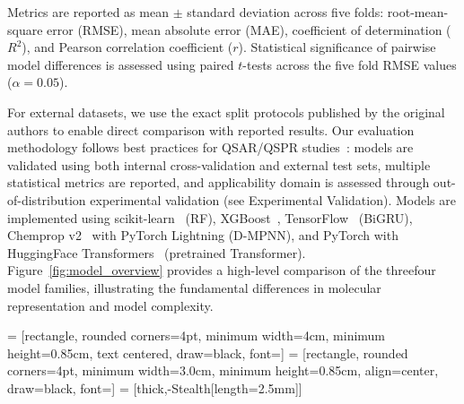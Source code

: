 \documentclass[journal=jcisd8,manuscript=article]{achemso}
\newcommand{\added}[1]{{\color{addedblue}#1}}
\newcommand{\removed}[1]{{\color{removedred}#1}}
\begin{document}
Metrics are reported as mean $\pm$ standard deviation across five folds: root-mean-square error (RMSE), mean absolute error (MAE), coefficient of determination ($R^2$), and Pearson correlation coefficient ($r$).
Statistical significance of pairwise model differences is assessed using paired $t$-tests across the five fold RMSE values ($\alpha = 0.05$).

For external datasets, we use the exact split protocols published by the original authors to enable direct comparison with reported results.
Our evaluation methodology follows best practices for QSAR/QSPR studies~\cite{tropsha2006best, cherkasov2014qsar}: models are validated using both internal cross-validation and external test sets, multiple statistical metrics are reported, and applicability domain is assessed through out-of-distribution experimental validation (see Experimental Validation).
Models are implemented using scikit-learn~\cite{pedregosa2011scikit} (RF), XGBoost~\cite{chen2016xgboost}, TensorFlow~\cite{abadi2016tensorflow} (BiGRU), Chemprop v2~\cite{yangAnalyzingLearnedMolecular2019} with PyTorch Lightning (D-MPNN), and PyTorch with HuggingFace Transformers~\cite{chithrananda2020chemberta} (pretrained Transformer).
Figure~\ref{fig:model_overview} provides a high-level comparison of the \removed{three}\added{four} model families, illustrating the fundamental differences in molecular representation and model complexity.


 = [rectangle, rounded corners=4pt, minimum width=4cm, minimum height=0.85cm, text centered, draw=black, font=\small]
 = [rectangle, rounded corners=4pt, minimum width=3.0cm, minimum height=0.85cm, align=center, draw=black, font=\small]
 = [thick,-{Stealth[length=2.5mm]}]
\end{document}
